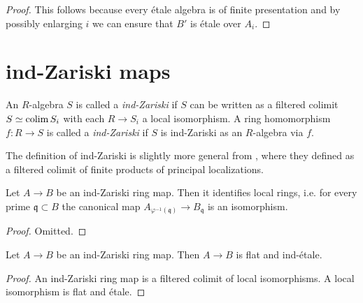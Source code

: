 \begin{proof}
    This follows because every étale algebra is of finite presentation and by possibly enlarging $i$ we can ensure
    that $B'$ is étale over $A_i$.
\end{proof}

\section{ind-Zariski maps}

\begin{definition}
    \label{def:ind-Zariski}
    \leanok
    An $R$-algebra $S$ is called a \emph{ind-Zariski} if $S$ can be written as a filtered colimit $S \simeq \operatorname{colim} S_i$ with each $R \to S_i$ a local isomorphism. A ring homomorphism $f : R \to S$ is called a \emph{ind-Zariski} if $S$ is ind-Zariski as an $R$-algebra via $f$.
\end{definition}

\begin{remark}
  The definition of ind-Zariski is slightly more general from \cite[Definition 2.2.1(iv)]{proetale}, where they defined as a filtered colimit of finite products of principal localizations.
\end{remark}

\begin{lemma}
  Let $A \to B$ be an ind-Zariski ring map. Then it identifies local rings, i.e. for every prime $\mathfrak{q} \subset B$ the canonical map $A_{\varphi^{-1}(\mathfrak{q})} \to B_{\mathfrak{q}}$ is an isomorphism.
  \label{thm:ind-Zariski-identifies-local-rings}
\end{lemma}

\begin{proof}
  Omitted.
\end{proof}

\begin{lemma}
  Let $A \to B$ be an ind-Zariski ring map. Then $A \to B$ is flat and ind-étale.
  \label{thm:ind-Zariski-is-flat-ind-etale}
\end{lemma}

\begin{proof}
  An ind-Zariski ring map is a filtered colimit of local isomorphisms. A local isomorphism is flat and étale.
\end{proof}

